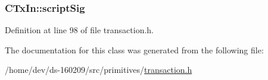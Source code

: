 \subsubsection[{script\+Sig}]{ C\+Tx\+In\+::script\+Sig}\label{class_c_tx_in_aba540fd902366210a6ad6cd9a18fe763}


Definition at line 98 of file transaction.\+h.



The documentation for this class was generated from the following file\+:\begin{DoxyCompactItemize}
\item 
/home/dev/ds-\/160209/src/primitives/\hyperlink{transaction_8h}{transaction.\+h}\end{DoxyCompactItemize}
